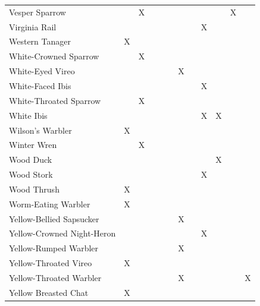 \documentclass[]{article}
\begin{document}
\begin{longtable}{llllllllllll}
Vesper Sparrow &  & X &  &  &  &  &  &  &  & X & \\
\addlinespace
Virginia Rail &  &  &  &  &  &  &  & X &  &  & \\
Western Tanager & X &  &  &  &  &  &  &  &  &  & \\
White-Crowned Sparrow &  & X &  &  &  &  &  &  &  &  & \\
White-Eyed Vireo &  &  &  &  &  & X &  &  &  &  & \\
White-Faced Ibis &  &  &  &  &  &  &  & X &  &  & \\
\addlinespace
White-Throated Sparrow &  & X &  &  &  &  &  &  &  &  & \\
White Ibis &  &  &  &  &  &  &  & X & X &  & \\
Wilson's Warbler & X &  &  &  &  &  &  &  &  &  & \\
Winter Wren &  & X &  &  &  &  &  &  &  &  & \\
Wood Duck &  &  &  &  &  &  &  &  & X &  & \\
\addlinespace
Wood Stork &  &  &  &  &  &  &  & X &  &  & \\
Wood Thrush & X &  &  &  &  &  &  &  &  &  & \\
Worm-Eating Warbler & X &  &  &  &  &  &  &  &  &  & \\
Yellow-Bellied Sapsucker &  &  &  &  &  & X &  &  &  &  & \\
Yellow-Crowned Night-Heron &  &  &  &  &  &  &  & X &  &  & \\
\addlinespace
Yellow-Rumped Warbler &  &  &  &  &  & X &  &  &  &  & \\
Yellow-Throated Vireo & X &  &  &  &  &  &  &  &  &  & \\
Yellow-Throated Warbler &  &  &  &  &  & X &  &  &  &  & X\\
Yellow Breasted Chat & X &  &  &  &  &  &  &  &  &  & \\
\bottomrule
\end{longtable}
\end{document}
